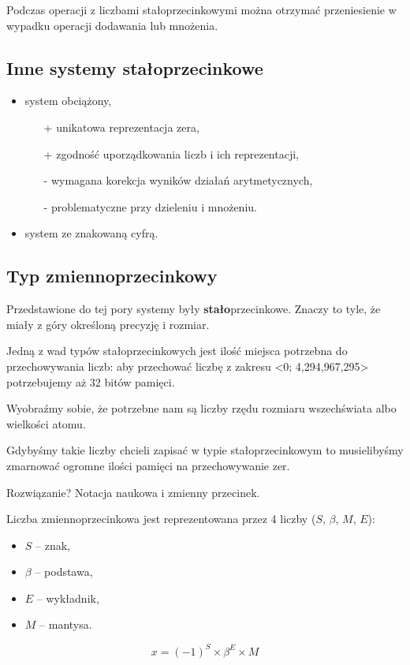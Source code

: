 Podczas operacji z liczbami stałoprzecinkowymi można otrzymać przeniesienie w wypadku operacji dodawania lub mnożenia.

\subsection{Inne systemy stałoprzecinkowe}
\begin{itemize}
\item system obciążony,
\begin{itemize}
\item[+] unikatowa reprezentacja zera,
\item[+] zgodność uporządkowania liczb i ich reprezentacji,
\item[-] wymagana korekcja wyników działań arytmetycznych,
\item[-] problematyczne przy dzieleniu i mnożeniu.
\end{itemize}
\item system ze znakowaną cyfrą.
\end{itemize}

\subsection{Typ zmiennoprzecinkowy}
Przedstawione do tej pory systemy były \textbf{stało}przecinkowe.
Znaczy to tyle, że miały z góry określoną precyzję i rozmiar.

Jedną z wad typów stałoprzecinkowych jest ilość miejsca potrzebna do przechowywania liczb: aby przechować liczbę z zakresu <0; 4,294,967,295> potrzebujemy aż 32 bitów pamięci.

Wyobraźmy sobie, że potrzebne nam są liczby rzędu rozmiaru wszechświata albo wielkości atomu.

Gdybyśmy takie liczby chcieli zapisać w typie stałoprzecinkowym to musielibyśmy zmarnować ogromne ilości pamięci na przechowywanie zer.

Rozwiązanie? Notacja naukowa i zmienny przecinek.

Liczba zmiennoprzecinkowa jest reprezentowana przez 4 liczby ($S$, $\beta$, $M$, $E$):
\begin{itemize}
\item $S$ -- znak,
\item $\beta$ -- podstawa,
\item $E$ -- wykładnik,
\item $M$ -- mantysa.
\end{itemize}
\begin{equation}
x = (-1)^{S} \times \beta^{E} \times M
\end{equation}

